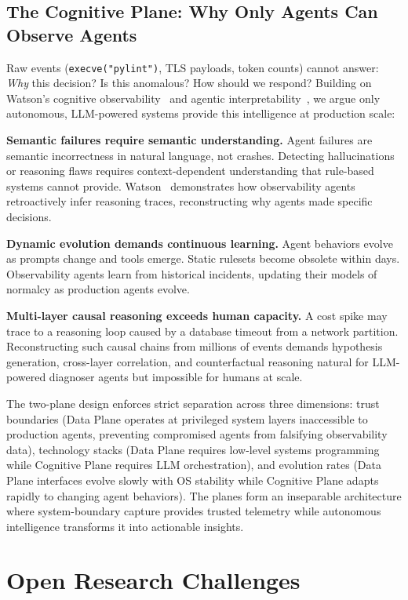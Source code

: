\documentclass[sigplan,screen,9pt]{acmart}
\begin{document}
\subsection{The Cognitive Plane: Why Only Agents Can Observe Agents}

Raw events (\texttt{execve("pylint")}, TLS payloads, token counts) cannot answer: \emph{Why} this decision? Is this anomalous? How should we respond? Building on Watson's cognitive observability~\cite{Rombaut2025Watson} and agentic interpretability~\cite{Kim2025AgenticInterp}, we argue only autonomous, LLM-powered systems provide this intelligence at production scale:

\textbf{Semantic failures require semantic understanding.} Agent failures are semantic incorrectness in natural language, not crashes. Detecting hallucinations or reasoning flaws requires context-dependent understanding that rule-based systems cannot provide. Watson~\cite{Rombaut2025Watson} demonstrates how observability agents retroactively infer reasoning traces, reconstructing why agents made specific decisions.

\textbf{Dynamic evolution demands continuous learning.} Agent behaviors evolve as prompts change and tools emerge. Static rulesets become obsolete within days. Observability agents learn from historical incidents, updating their models of normalcy as production agents evolve.

\textbf{Multi-layer causal reasoning exceeds human capacity.} A cost spike may trace to a reasoning loop caused by a database timeout from a network partition. Reconstructing such causal chains from millions of events demands hypothesis generation, cross-layer correlation, and counterfactual reasoning natural for LLM-powered diagnoser agents but impossible for humans at scale.

The two-plane design enforces strict separation across three dimensions: trust boundaries (Data Plane operates at privileged system layers inaccessible to production agents, preventing compromised agents from falsifying observability data), technology stacks (Data Plane requires low-level systems programming while Cognitive Plane requires LLM orchestration), and evolution rates (Data Plane interfaces evolve slowly with OS stability while Cognitive Plane adapts rapidly to changing agent behaviors). The planes form an inseparable architecture where system-boundary capture provides trusted telemetry while autonomous intelligence transforms it into actionable insights.

\section{Open Research Challenges}
\end{document}
